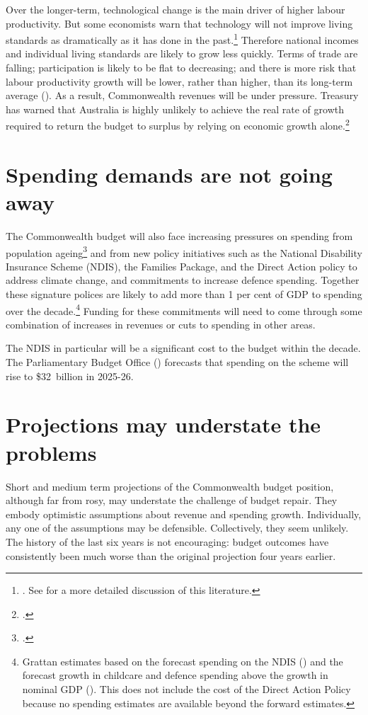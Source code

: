 \documentclass[twoside,english]{grattanBudgetRepairb5portrait}
\begin{document}
Over the longer-term, technological change is the main driver of higher labour productivity. But some economists warn that technology will not improve living standards as dramatically as it has done in the past.\footnote{\textcites{Gordon2012}{Cowen2011}. See \textcites{DaleyWoodWeidmannEtAl2014}{Dolamore2015} for a more detailed discussion of this literature.}  Therefore national incomes and individual living standards are likely to grow less quickly. Terms of trade are falling; participation is likely to be flat to decreasing; and there is more risk that labour productivity growth will be lower, rather than higher, than its long-term average (). As a result, Commonwealth revenues will be under pressure. Treasury has warned that Australia is highly unlikely to achieve the real rate of growth required to return the budget to surplus by relying on economic growth alone.\footcite{Parkinson2014}  

\section{Spending demands are not going away\label{sec:FISCAL-3-2}}
The Commonwealth budget will also face increasing pressures on spending from population ageing\footcite{Hockey2015IGR}  and from new policy initiatives such as the National Disability Insurance Scheme (NDIS), the Families Package, and the Direct Action policy to address climate change, and commitments to increase defence spending. Together these signature polices are likely to add more than 1 per cent of GDP to spending over the decade.\footnote{Grattan estimates based on the forecast spending on the NDIS (\textcite{Commission2014})
and the forecast growth in childcare and defence spending above the growth in nominal GDP (\textcite{NationalCommissionAudit2014}). This does not include the cost of the Direct Action Policy because no spending estimates are available beyond the forward estimates. 
}  Funding for these commitments will need to come through some combination of increases in revenues or cuts to spending in other areas. 

The NDIS in particular will be a significant cost to the budget within the decade. The Parliamentary Budget Office (\textcite[][5]{PBO2015}) forecasts that spending on the scheme will rise to \$32~billion in 2025-26. 

\section{Projections may understate the problems\label{sec:FISCAL-3-3}}
Short and medium term projections of the Commonwealth budget position, although far from rosy, may understate the challenge of budget repair. They embody optimistic assumptions about revenue and spending growth. Individually, any one of the assumptions may be defensible. Collectively, they seem unlikely. The history of the last six years is not encouraging: budget outcomes have consistently been much worse than the original projection four years earlier.
\end{document}
